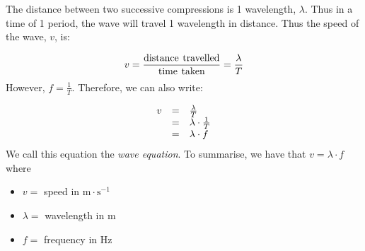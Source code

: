    
        \label{m38806*id319706}The distance between two successive compressions is 1 wavelength, $\lambda$. Thus in a time of 1 period, the wave will travel 1 wavelength in distance. Thus the speed of the wave, $v$, is:\par 
        \label{m38806*id319732}\nopagebreak\noindent{}
    \begin{equation*}
    v=\frac{\text{distance}\phantom{\rule{4.pt}{0ex}}\text{travelled}}{\text{time}\phantom{\rule{4.pt}{0ex}}\text{taken}}=\frac{\lambda }{T}
      \end{equation*}
        \label{m38806*id319776}However, $f=\frac{1}{T}$. Therefore, we can also write:\par 
        \label{m38806*id319802}\nopagebreak\noindent{}
          
    \begin{equation*}
    \begin{array}{ccc}\hfill v& =& \frac{\lambda }{T}\hfill \\ & =& \lambda \ensuremath{\cdot}\frac{1}{T}\hfill \\ & =& \lambda \ensuremath{\cdot}f\hfill \end{array}
      \end{equation*}
        \label{m38806*id319870}We call this equation the \textsl{wave equation}. To summarise, we have that $v=\lambda \ensuremath{\cdot}f$ where\par 
        \label{m38806*id319901}\begin{itemize}[noitemsep]
            \label{m38806*uid22}\item $v=$ speed in $\text{m}\ensuremath{\cdot}\text{s}{}^{-1}$\label{m38806*uid23}\item $\lambda =$ wavelength in $\text{m}$
\item $f=$ frequency in $\text{Hz}$
\end{itemize}
\par

